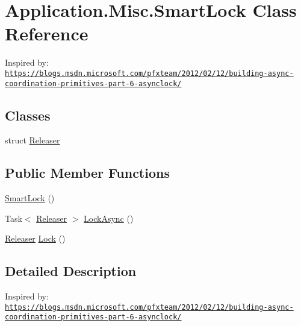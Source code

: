 \hypertarget{class_application_1_1_misc_1_1_smart_lock}{}\section{Application.\+Misc.\+Smart\+Lock Class Reference}
\label{class_application_1_1_misc_1_1_smart_lock}


Inspired by\+: \href{https://blogs.msdn.microsoft.com/pfxteam/2012/02/12/building-async-coordination-primitives-part-6-asynclock/}{\tt https\+://blogs.\+msdn.\+microsoft.\+com/pfxteam/2012/02/12/building-\/async-\/coordination-\/primitives-\/part-\/6-\/asynclock/}  


\subsection*{Classes}
\begin{DoxyCompactItemize}
\item 
struct \mbox{\hyperlink{struct_application_1_1_misc_1_1_smart_lock_1_1_releaser}{Releaser}}
\end{DoxyCompactItemize}
\subsection*{Public Member Functions}
\begin{DoxyCompactItemize}
\item 
\mbox{\hyperlink{class_application_1_1_misc_1_1_smart_lock_a0457fe6081ff3c8eec2afa42ed24bc8f}{Smart\+Lock}} ()
\item 
Task$<$ \mbox{\hyperlink{struct_application_1_1_misc_1_1_smart_lock_1_1_releaser}{Releaser}} $>$ \mbox{\hyperlink{class_application_1_1_misc_1_1_smart_lock_af850c4ff0257ebcd9318688e13204e91}{Lock\+Async}} ()
\item 
\mbox{\hyperlink{struct_application_1_1_misc_1_1_smart_lock_1_1_releaser}{Releaser}} \mbox{\hyperlink{class_application_1_1_misc_1_1_smart_lock_a10db87dc210c66e3760ebcdb897b4522}{Lock}} ()
\end{DoxyCompactItemize}


\subsection{Detailed Description}
Inspired by\+: \href{https://blogs.msdn.microsoft.com/pfxteam/2012/02/12/building-async-coordination-primitives-part-6-asynclock/}{\tt https\+://blogs.\+msdn.\+microsoft.\+com/pfxteam/2012/02/12/building-\/async-\/coordination-\/primitives-\/part-\/6-\/asynclock/} 



